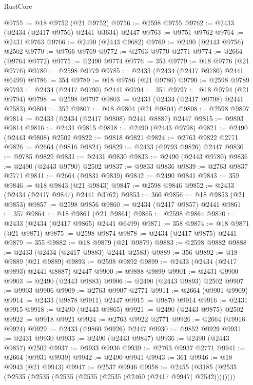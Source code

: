 \begin{lexlean}{RustCore}
\begin{coremodule}
@9755 := @18 @9752 (@21 @9752)
@9756 := @2598 @9755
@9762 := @2433 (@2434 (@2417 @9756) @2441 @3634) @2447
@9763 := @9751 @9762
@9764 := @2431 @9763
@9766 := @2490 (@2443 @9682)
@9769 := @2490 (@2443 @9756) @2502
@9770 := @9766 @9769
@9772 := @2763 @9770 @2771
@9774 := @2664 (@9764 @9772)
@9775 := @2490 @9774
@9776 := 353
@9779 := @18 @9776 (@21 @9776)
@9780 := @2598 @9779
@9785 := @2433 (@2434 (@2417 @9780) @2441 @6499)
@9786 := 354
@9789 := @18 @9786 (@21 @9786)
@9790 := @2598 @9789
@9793 := @2434 (@2417 @9790) @2441
@9794 := 351
@9797 := @18 @9794 (@21 @9794)
@9798 := @2598 @9797
@9803 := @2433 (@2434 (@2417 @9798) @2441 @2583)
@9804 := 352
@9807 := @18 @9804 (@21 @9804)
@9808 := @2598 @9807
@9814 := @2433 (@2434 (@2417 @9808) @2441 @8887) @2447
@9815 := @9803 @9814
@9816 := @2431 @9815
@9818 := @2490 (@2443 @9798)
@9821 := @2490 (@2443 @9808) @2502
@9822 := @9818 @9821
@9824 := @2763 @9822 @2771
@9826 := @2664 (@9816 @9824)
@9829 := @2433 (@9793 @9826) @2447
@9830 := @9785 @9829
@9831 := @2431 @9830
@9833 := @2490 (@2443 @9780)
@9836 := @2490 (@2443 @9790) @2502
@9837 := @9833 @9836
@9839 := @2763 @9837 @2771
@9841 := @2664 (@9831 @9839)
@9842 := @2490 @9841
@9843 := 359
@9846 := @18 @9843 (@21 @9843)
@9847 := @2598 @9846
@9852 := @2433 (@2434 (@2417 @9847) @2441 @3762)
@9853 := 360
@9856 := @18 @9853 (@21 @9853)
@9857 := @2598 @9856
@9860 := @2434 (@2417 @9857) @2441
@9861 := 357
@9864 := @18 @9861 (@21 @9861)
@9865 := @2598 @9864
@9870 := @2433 (@2434 (@2417 @9865) @2441 @6499)
@9871 := 358
@9874 := @18 @9871 (@21 @9871)
@9875 := @2598 @9874
@9878 := @2434 (@2417 @9875) @2441
@9879 := 355
@9882 := @18 @9879 (@21 @9879)
@9883 := @2598 @9882
@9888 := @2433 (@2434 (@2417 @9883) @2441 @2583)
@9889 := 356
@9892 := @18 @9889 (@21 @9889)
@9893 := @2598 @9892
@9899 := @2433 (@2434 (@2417 @9893) @2441 @8887) @2447
@9900 := @9888 @9899
@9901 := @2431 @9900
@9903 := @2490 (@2443 @9883)
@9906 := @2490 (@2443 @9893) @2502
@9907 := @9903 @9906
@9909 := @2763 @9907 @2771
@9911 := @2664 (@9901 @9909)
@9914 := @2433 (@9878 @9911) @2447
@9915 := @9870 @9914
@9916 := @2431 @9915
@9918 := @2490 (@2443 @9865)
@9921 := @2490 (@2443 @9875) @2502
@9922 := @9918 @9921
@9924 := @2763 @9922 @2771
@9926 := @2664 (@9916 @9924)
@9929 := @2433 (@9860 @9926) @2447
@9930 := @9852 @9929
@9931 := @2431 @9930
@9933 := @2490 (@2443 @9847)
@9936 := @2490 (@2443 @9857) @2502
@9937 := @9933 @9936
@9939 := @2763 @9937 @2771
@9941 := @2664 (@9931 @9939)
@9942 := @2490 @9941
@9943 := 361
@9946 := @18 @9943 (@21 @9943)
@9947 := @2537 @9946
@9958 := @2455 (@3185 (@2535 (@2535 (@2535 (@2535 (@2535 (@2535 (@2460 (@2417 @9947) @2542))))))))

\end{coremodule}
\end{lexlean}
